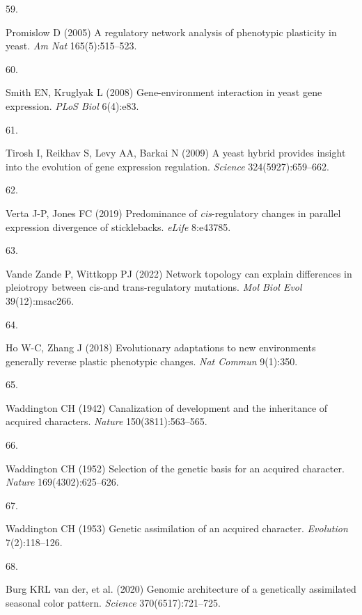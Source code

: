 \documentclass[9pt,twocolumn,twoside,lineno]{pnas-new}
\newlength{\cslhangindent}
\newlength{\csllabelwidth}
\newlength{\cslentryspacingunit} %
\newenvironment{CSLReferences}[2] %
 {%
  \setlength{\parindent}{0pt}
  \ifodd #1
  \let\oldpar\par
  \def\par{\hangindent=\cslhangindent\oldpar}
  \fi
  \setlength{\parskip}{#2\cslentryspacingunit}
 }%
 {}
\newcommand{\CSLLeftMargin}[1]{\parbox[t]{\csllabelwidth}{#1}}
\newcommand{\CSLRightInline}[1]{\parbox[t]{\linewidth - \csllabelwidth}{#1}\break}
\begin{document}
\begin{CSLReferences}{0}{0}
\leavevmode{}%
\CSLLeftMargin{59. }%
\CSLRightInline{Promislow D (2005) A regulatory network analysis of
phenotypic plasticity in yeast. \emph{Am Nat} 165(5):515--523.}

\leavevmode{}%
\CSLLeftMargin{60. }%
\CSLRightInline{Smith EN, Kruglyak L (2008) Gene-environment interaction
in yeast gene expression. \emph{PLoS Biol} 6(4):e83.}

\leavevmode{}%
\CSLLeftMargin{61. }%
\CSLRightInline{Tirosh I, Reikhav S, Levy AA, Barkai N (2009) A yeast
hybrid provides insight into the evolution of gene expression
regulation. \emph{Science} 324(5927):659--662.}

\leavevmode{}%
\CSLLeftMargin{62. }%
\CSLRightInline{Verta J-P, Jones FC (2019) Predominance of
\emph{cis}-regulatory changes in parallel expression divergence of
sticklebacks. \emph{eLife} 8:e43785.}

\leavevmode{}%
\CSLLeftMargin{63. }%
\CSLRightInline{Vande Zande P, Wittkopp PJ (2022) Network topology can
explain differences in pleiotropy between cis-and trans-regulatory
mutations. \emph{Mol Biol Evol} 39(12):msac266.}

\leavevmode{}%
\CSLLeftMargin{64. }%
\CSLRightInline{Ho W-C, Zhang J (2018) Evolutionary adaptations to new
environments generally reverse plastic phenotypic changes. \emph{Nat
Commun} 9(1):350.}

\leavevmode{}%
\CSLLeftMargin{65. }%
\CSLRightInline{Waddington CH (1942) Canalization of development and the
inheritance of acquired characters. \emph{Nature} 150(3811):563--565.}

\leavevmode{}%
\CSLLeftMargin{66. }%
\CSLRightInline{Waddington CH (1952) Selection of the genetic basis for
an acquired character. \emph{Nature} 169(4302):625--626.}

\leavevmode{}%
\CSLLeftMargin{67. }%
\CSLRightInline{Waddington CH (1953) Genetic assimilation of an acquired
character. \emph{Evolution} 7(2):118--126.}

\leavevmode{}%
\CSLLeftMargin{68. }%
\CSLRightInline{Burg KRL van der, et al. (2020) Genomic architecture of
a genetically assimilated seasonal color pattern. \emph{Science}
370(6517):721--725.}


\end{CSLReferences}
\end{document}
